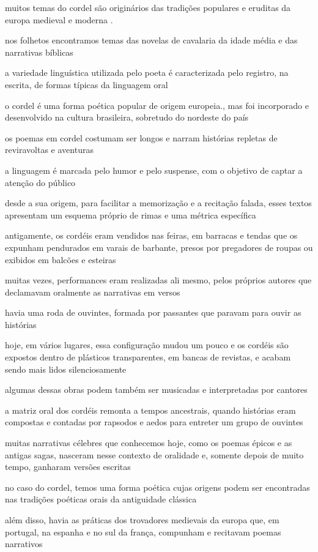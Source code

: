 muitos temas do cordel  são originários das tradições populares e eruditas da europa medieval e moderna .

nos folhetos  encontramos temas das novelas de cavalaria da idade média  e das narrativas bíblicas 

a variedade linguística utilizada pelo poeta é caracterizada pelo registro, na escrita, de formas típicas da linguagem oral

o cordel é uma forma poética popular de origem europeia., mas foi incorporado e desenvolvido na cultura brasileira, sobretudo do nordeste do país

os poemas em cordel costumam ser longos e narram histórias repletas de reviravoltas e aventuras

a linguagem é marcada pelo humor e pelo suspense, com o objetivo de captar a atenção do público

desde a sua origem, para facilitar a memorização e a recitação falada, esses textos apresentam um esquema próprio de rimas e uma métrica específica

antigamente, os cordéis eram vendidos nas feiras, em barracas e tendas que os expunham pendurados em varais de barbante, presos por pregadores de roupas ou exibidos em balcões e esteiras

muitas vezes, performances eram realizadas ali mesmo, pelos próprios autores que declamavam oralmente as narrativas em versos

havia uma roda de ouvintes, formada por passantes que paravam para ouvir as histórias

hoje, em vários lugares, essa configuração mudou um pouco e os cordéis são expostos dentro de plásticos transparentes, em bancas de revistas, e acabam sendo mais lidos silenciosamente

algumas dessas obras podem também ser musicadas e interpretadas por cantores

a matriz oral dos cordéis remonta a tempos ancestrais, quando histórias eram compostas e contadas por rapsodos e aedos para entreter um grupo de ouvintes

muitas narrativas célebres que conhecemos hoje, como os poemas épicos e as antigas sagas, nasceram nesse contexto de oralidade e, somente depois de muito tempo, ganharam versões escritas

no caso do cordel, temos uma forma poética cujas origens podem ser encontradas nas tradições poéticas orais da antiguidade clássica

além disso, havia as práticas dos trovadores medievais da europa que, em portugal, na espanha e no sul da frança, compunham e recitavam poemas narrativos

